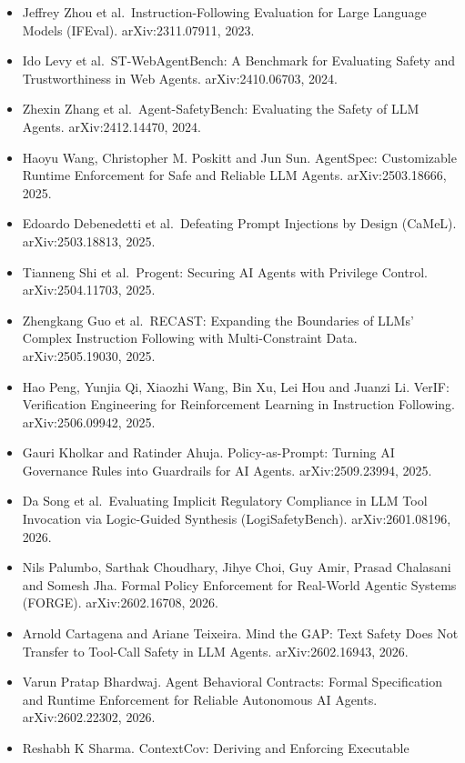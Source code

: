 \documentclass{article}
\providecommand{\tightlist}{\setlength{\itemsep}{0pt}\setlength{\parskip}{0pt}}
\begin{document}
\begin{itemize}
\tightlist
\item
  Jeffrey Zhou et al.~Instruction-Following Evaluation for Large
  Language Models (IFEval). arXiv:2311.07911, 2023.
\item
  Ido Levy et al.~ST-WebAgentBench: A Benchmark for Evaluating Safety
  and Trustworthiness in Web Agents. arXiv:2410.06703, 2024.
\item
  Zhexin Zhang et al.~Agent-SafetyBench: Evaluating the Safety of LLM
  Agents. arXiv:2412.14470, 2024.
\item
  Haoyu Wang, Christopher M. Poskitt and Jun Sun. AgentSpec:
  Customizable Runtime Enforcement for Safe and Reliable LLM Agents.
  arXiv:2503.18666, 2025.
\item
  Edoardo Debenedetti et al.~Defeating Prompt Injections by Design
  (CaMeL). arXiv:2503.18813, 2025.
\item
  Tianneng Shi et al.~Progent: Securing AI Agents with Privilege
  Control. arXiv:2504.11703, 2025.
\item
  Zhengkang Guo et al.~RECAST: Expanding the Boundaries of LLMs' Complex
  Instruction Following with Multi-Constraint Data. arXiv:2505.19030,
  2025.
\item
  Hao Peng, Yunjia Qi, Xiaozhi Wang, Bin Xu, Lei Hou and Juanzi Li.
  VerIF: Verification Engineering for Reinforcement Learning in
  Instruction Following. arXiv:2506.09942, 2025.
\item
  Gauri Kholkar and Ratinder Ahuja. Policy-as-Prompt: Turning AI
  Governance Rules into Guardrails for AI Agents. arXiv:2509.23994,
  2025.
\item
  Da Song et al.~Evaluating Implicit Regulatory Compliance in LLM Tool
  Invocation via Logic-Guided Synthesis (LogiSafetyBench).
  arXiv:2601.08196, 2026.
\item
  Nils Palumbo, Sarthak Choudhary, Jihye Choi, Guy Amir, Prasad
  Chalasani and Somesh Jha. Formal Policy Enforcement for Real-World
  Agentic Systems (FORGE). arXiv:2602.16708, 2026.
\item
  Arnold Cartagena and Ariane Teixeira. Mind the GAP: Text Safety Does
  Not Transfer to Tool-Call Safety in LLM Agents. arXiv:2602.16943,
  2026.
\item
  Varun Pratap Bhardwaj. Agent Behavioral Contracts: Formal
  Specification and Runtime Enforcement for Reliable Autonomous AI
  Agents. arXiv:2602.22302, 2026.
\item
  Reshabh K Sharma. ContextCov: Deriving and Enforcing Executable

\end{itemize}
\end{document}
